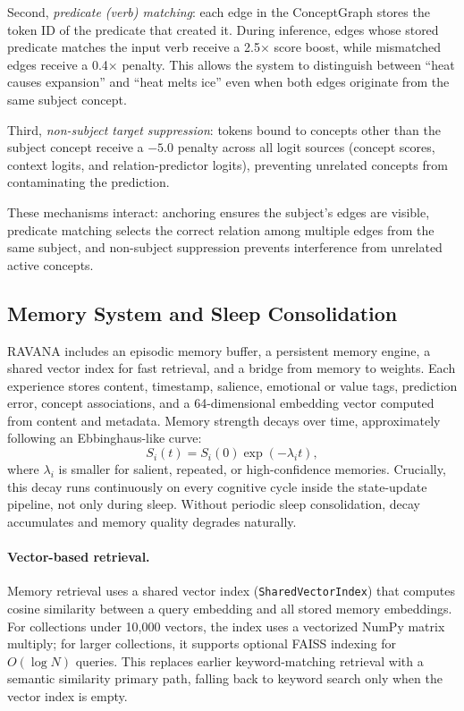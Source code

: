 \documentclass[11pt]{article}
\begin{document}
Second, \emph{predicate (verb) matching}: each edge in the ConceptGraph stores the token ID of the predicate that created it. During inference, edges whose stored predicate matches the input verb receive a 2.5$\times$ score boost, while mismatched edges receive a 0.4$\times$ penalty. This allows the system to distinguish between ``heat causes expansion'' and ``heat melts ice'' even when both edges originate from the same subject concept.

Third, \emph{non-subject target suppression}: tokens bound to concepts other than the subject concept receive a $-5.0$ penalty across all logit sources (concept scores, context logits, and relation-predictor logits), preventing unrelated concepts from contaminating the prediction.

These mechanisms interact: anchoring ensures the subject's edges are visible, predicate matching selects the correct relation among multiple edges from the same subject, and non-subject suppression prevents interference from unrelated active concepts.

\subsection{Memory System and Sleep Consolidation}
RAVANA includes an episodic memory buffer, a persistent memory engine, a shared vector index for fast retrieval, and a bridge from memory to weights. Each experience stores content, timestamp, salience, emotional or value tags, prediction error, concept associations, and a 64-dimensional embedding vector computed from content and metadata. Memory strength decays over time, approximately following an Ebbinghaus-like curve:
\begin{equation}
 S_i(t)=S_i(0)\exp(-\lambda_i t),
\end{equation}
where $\lambda_i$ is smaller for salient, repeated, or high-confidence memories. Crucially, this decay runs continuously on every cognitive cycle inside the state-update pipeline, not only during sleep. Without periodic sleep consolidation, decay accumulates and memory quality degrades naturally.

\paragraph{Vector-based retrieval.}
Memory retrieval uses a shared vector index (\texttt{SharedVectorIndex}) that computes cosine similarity between a query embedding and all stored memory embeddings. For collections under 10{,}000 vectors, the index uses a vectorized NumPy matrix multiply; for larger collections, it supports optional FAISS indexing for $O(\log N)$ queries. This replaces earlier keyword-matching retrieval with a semantic similarity primary path, falling back to keyword search only when the vector index is empty.
\end{document}
